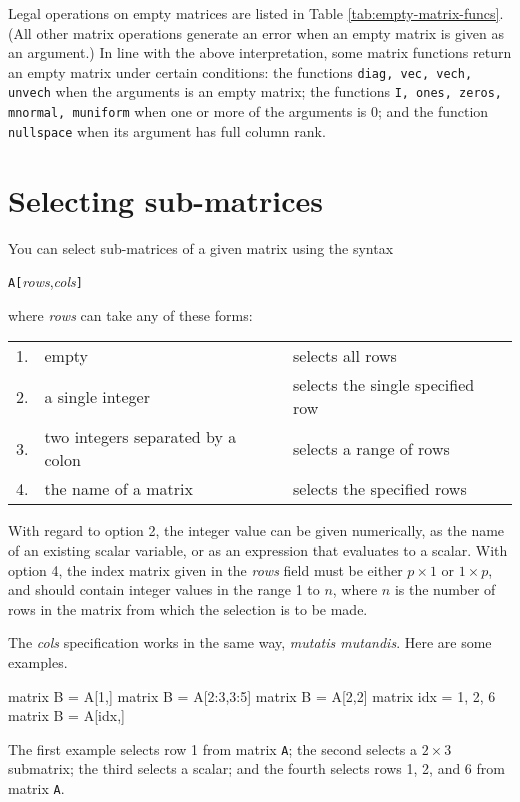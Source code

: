 Legal operations on empty matrices are listed in Table
\ref{tab:empty-matrix-funcs}.  (All other matrix operations generate
an error when an empty matrix is given as an argument.)  In line with
the above interpretation, some matrix functions return an empty matrix
under certain conditions: the functions \texttt{diag, vec, vech,
  unvech} when the arguments is an empty matrix; the functions
\texttt{I, ones, zeros, mnormal, muniform} when one or more of the
arguments is 0; and the function \texttt{nullspace} when its argument
has full column rank.

\section{Selecting sub-matrices}
\label{sec:matrix-sub}

You can select sub-matrices of a given matrix using the syntax

\hspace{1em} \texttt{A[}\textsl{rows},\textsl{cols}\texttt{]}

where \textsl{rows} can take any of these forms:

\begin{center}
\begin{tabular}{lll}
1. & empty & selects all rows \\
2. & a single integer & selects the single specified row \\
3. & two integers separated by a colon & selects a range of rows \\
4. & the name of a matrix & selects the specified rows \\
\end{tabular}
\end{center}

With regard to option 2, the integer value can be given numerically,
as the name of an existing scalar variable, or as an expression that
evaluates to a scalar.  With option 4, the index matrix given in the
\textsl{rows} field must be either $p\times 1$ or $1\times p$, and
should contain integer values in the range 1 to $n$, where $n$ is the
number of rows in the matrix from which the selection is to be made.

The \textsl{cols} specification works in the same way, \textit{mutatis
  mutandis}.  Here are some examples.
%
\begin{code}
matrix B = A[1,]
matrix B = A[2:3,3:5]
matrix B = A[2,2]
matrix idx = {1, 2, 6}
matrix B = A[idx,]
\end{code}
%
The first example selects row 1 from matrix \texttt{A}; the second
selects a $2\times 3$ submatrix; the third selects a scalar; and
the fourth selects rows 1, 2, and 6 from matrix \texttt{A}.

